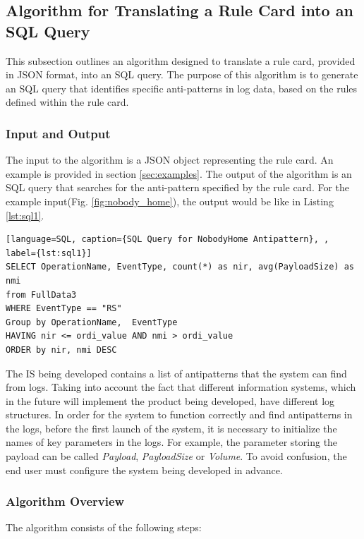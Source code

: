 \documentclass[12pt, times]{article}
\begin{document}
	\subsection{Algorithm for Translating a Rule Card into an SQL Query}
	
	This subsection outlines an algorithm designed to translate a rule card, provided in JSON format, into an SQL query. The purpose of this algorithm is to generate an SQL query that identifies specific anti-patterns in log data, based on the rules defined within the rule card.
	
	\subsubsection*{Input and Output}
	\hspace*{5mm} The input to the algorithm is a JSON object representing the rule card. An example is provided in section \ref{sec:examples}. The output of the algorithm is an SQL query that searches for the anti-pattern specified by the rule card. For the example input(Fig. \ref{fig:nobody_home}), the output would be like in Listing \ref{lst:sql1}. 
	
\begin{lstlisting}[language=SQL, caption={SQL Query for NobodyHome Antipattern}, , label={lst:sql1}]
SELECT OperationName, EventType, count(*) as nir, avg(PayloadSize) as nmi 
from FullData3
WHERE EventType == "RS"
Group by OperationName,  EventType
HAVING nir <= ordi_value AND nmi > ordi_value
ORDER by nir, nmi DESC
\end{lstlisting}

	\hspace*{5mm} The IS being developed contains a list of antipatterns that the system can find from logs. Taking into account the fact that different information systems, which in the future will implement the product being developed, have different log structures. In order for the system to function correctly and find antipatterns in the logs, before the first launch of the system, it is necessary to initialize the names of key parameters in the logs. For example, the parameter storing the payload can be called \textit{Payload}, \textit{PayloadSize} or \textit{Volume}. To avoid confusion, the end user must configure the system being developed in advance.
	
	\subsubsection*{Algorithm Overview}
	The algorithm consists of the following steps:
	
\end{document}
